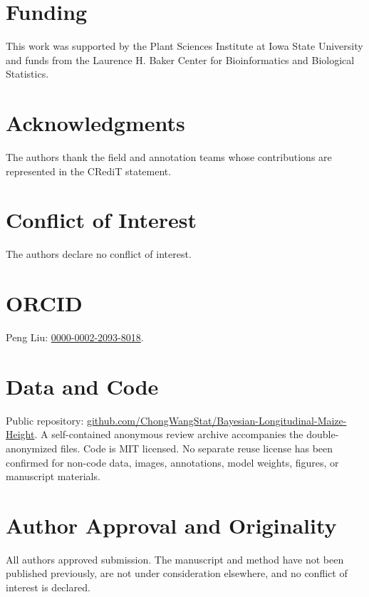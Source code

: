 \documentclass[review,12pt,authoryear]{elsarticle}
\begin{document}
\section*{Funding}
This work was supported by the Plant Sciences Institute at Iowa State University and funds from the Laurence H. Baker Center for Bioinformatics and Biological Statistics.

\section*{Acknowledgments}
The authors thank the field and annotation teams whose contributions are represented in the CRediT statement.

\section*{Conflict of Interest}
The authors declare no conflict of interest.

\section*{ORCID}
Peng Liu: \href{https://orcid.org/0000-0002-2093-8018}{0000-0002-2093-8018}.

\section*{Data and Code}
Public repository: \href{https://github.com/ChongWangStat/Bayesian-Longitudinal-Maize-Height}{github.com/ChongWangStat/Bayesian-Longitudinal-Maize-Height}. A self-contained anonymous review archive accompanies the double-anonymized files. Code is MIT licensed. No separate reuse license has been confirmed for non-code data, images, annotations, model weights, figures, or manuscript materials.

\section*{Author Approval and Originality}
All authors approved submission. The manuscript and method have not been published previously, are not under consideration elsewhere, and no conflict of interest is declared.
\end{document}
